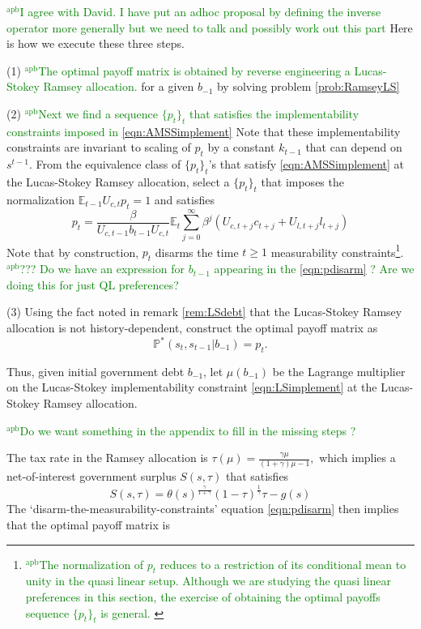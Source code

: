 \documentclass[12pt]{article}
\newcommand{\apb}[1]{\textcolor{green}{$^{\textrm{apb}}${#1}}}
\newcommand{\EE}{\mathbb E}
\begin{document}
\apb{I agree with David. I have put an adhoc proposal by defining the inverse operator more generally but we need to talk and possibly work out this part}
Here is how we execute these three steps.

\noindent (1) \apb{The optimal payoff matrix is obtained by reverse engineering a Lucas-Stokey Ramsey allocation.} for a given $b_{-1}$ by solving  problem \ref{prob:RamseyLS}


\noindent (2) \apb{Next we find a sequence $\{p_t\}_t$ that satisfies the implementability constraints imposed in \eqref{eqn:AMSSimplement}} Note that these implementability constraints are invariant to scaling of $p_t$ by a constant $k_{t-1} $ that can depend on $s^{t-1}$. From the equivalence class of $\{p_t\}_t$'s that satisfy \eqref{eqn:AMSSimplement} at the Lucas-Stokey Ramsey allocation, select a  $\{p_t\}_t$ that imposes the normalization  $\mathbb{E}_{t-1}U_{c,t}p_t=1$ and satisfies
\begin{equation}\label{eqn:pdisarm} p_t =  \frac{\beta}{U_{c,t-1} b_{t-1} U_{c,t}}\EE_t\sum_{j=0}^\infty\beta^j\left( U_{c,t+j}c_{t+j}+U_{l,t+j}l_{t+j}\right) \end{equation}
Note that by construction, $p_t$   disarms the time  $t\geq 1$
measurability constraints\footnote{\apb{The normalization of $p_t$ reduces to a restriction of its conditional mean to unity in the quasi linear setup. Although we are studying the quasi linear preferences in this section, the exercise of obtaining the optimal payoffs sequence $\{p_t\}_t$ is general. }}. 
\apb{??? Do we have an expression for $b_{t-1}$ appearing in the \eqref{eqn:pdisarm} ? Are we doing this for just QL preferences? }

\noindent  (3) Using the fact noted in remark \ref{rem:LSdebt} that the Lucas-Stokey Ramsey allocation is not history-dependent,  construct the optimal payoff matrix as
\[\mathbb{P}^*(s_t,s_{t-1}|b_{-1})=p_t.\]

Thus,  given
 initial government debt $b_{-1}$,  let $\mu(b_{-1})$ be the Lagrange multiplier on the Lucas-Stokey implementability constraint \eqref{eqn:LSimplement}
 at the Lucas-Stokey Ramsey allocation.  
 
 \apb{Do we want something in the appendix to fill in the missing steps ?}
 
 The tax rate in the Ramsey allocation is
$
		\tau(\mu) = \frac{\gamma\mu}{(1+\gamma)\mu-1},
	$
 which implies a  net-of-interest government surplus $S(s,\tau)$ that satisfies
\[		S(s,\tau) = \theta(s)^\frac\gamma{1+\gamma}(1-\tau)^\frac1\gamma\tau-g(s)
	\]
The `disarm-the-measurability-constraints' equation \eqref{eqn:pdisarm} then implies that the optimal payoff matrix is
\end{document}
